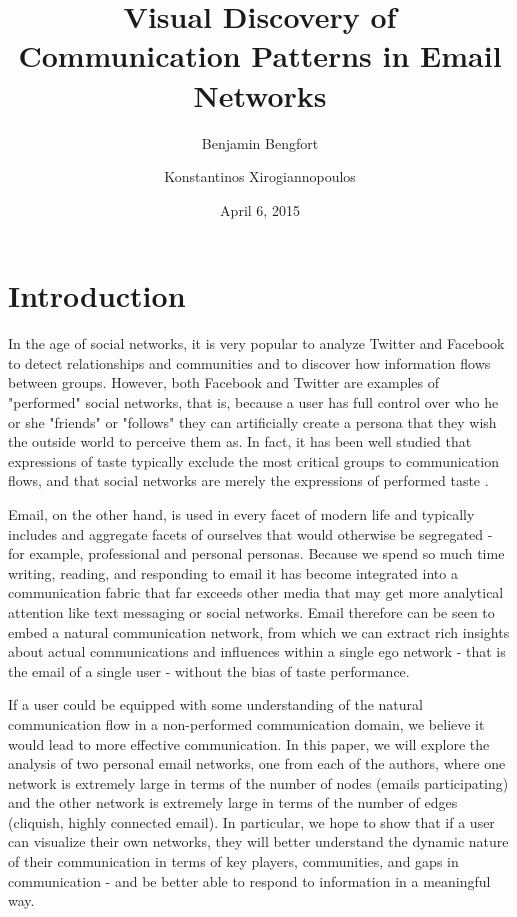 \documentclass[11pt,letterpaper]{article}
\begin{document}
\title{Visual Discovery of Communication Patterns in Email Networks}

\author[ ]{Benjamin Bengfort}
\author[ ]{Konstantinos Xirogiannopoulos}

\date{April 6, 2015}

\maketitle

\section*{Introduction}

In the age of social networks, it is very popular to analyze Twitter and Facebook to detect relationships and communities and to discover how information flows between groups. However, both Facebook and Twitter are examples of "performed" social networks, that is, because a user has full control over who he or she "friends" or "follows" they can artificially create a persona that they wish the outside world to perceive them as. In fact, it has been well studied that expressions of taste typically exclude the most critical groups to communication flows, and that social networks are merely the expressions of performed taste \cite{liu_social_2007}.

Email, on the other hand, is used in every facet of modern life and typically includes and aggregate facets of ourselves that would otherwise be segregated - for example, professional and personal personas. Because we spend so much time writing, reading, and responding to email it has become integrated into a communication fabric that far exceeds other media that may get more analytical attention like text messaging or social networks. Email therefore can be seen to embed a natural communication network, from which we can extract rich insights about actual communications and influences within a single ego network - that is the email  of a single user - without the bias of taste performance.

If a user could be equipped with some understanding of the natural communication flow in a non-performed communication domain, we believe it would lead to more effective communication. In this paper, we will explore the analysis of two personal email networks, one from each of the authors, where one network is extremely large in terms of the number of nodes (emails participating) and the other network is extremely large in terms of the number of edges (cliquish, highly connected email). In particular, we hope to show that if a user can visualize their own networks, they will better understand the dynamic nature of their communication in terms of key players, communities, and gaps in communication - and be better able to respond to information in a meaningful way.
\end{document}
